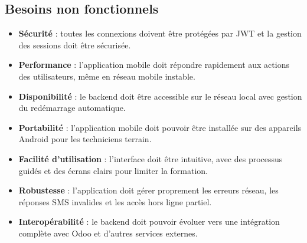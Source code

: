 \documentclass[12pt,a4paper]{report}
\begin{document}
\subsection{Besoins non fonctionnels}
\begin{itemize}
    \item \textbf{Sécurité} : toutes les connexions doivent être protégées par JWT et la gestion des sessions doit être sécurisée.
    \item \textbf{Performance} : l'application mobile doit répondre rapidement aux actions des utilisateurs, même en réseau mobile instable.
    \item \textbf{Disponibilité} : le backend doit être accessible sur le réseau local avec gestion du redémarrage automatique.
    \item \textbf{Portabilité} : l'application mobile doit pouvoir être installée sur des appareils Android pour les techniciens terrain.
    \item \textbf{Facilité d'utilisation} : l'interface doit être intuitive, avec des processus guidés et des écrans clairs pour limiter la formation.
    \item \textbf{Robustesse} : l'application doit gérer proprement les erreurs réseau, les réponses SMS invalides et les accès hors ligne partiel.
    \item \textbf{Interopérabilité} : le backend doit pouvoir évoluer vers une intégration complète avec Odoo et d'autres services externes.
\end{itemize}
\end{document}
